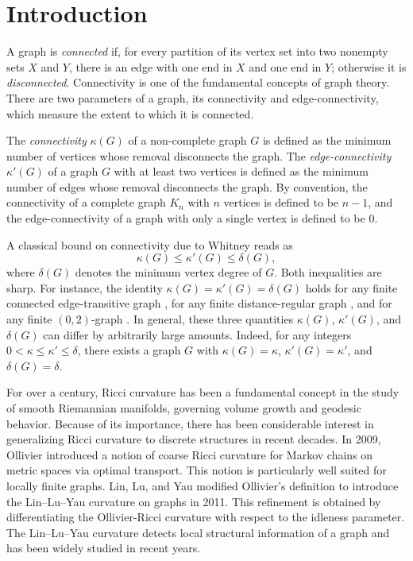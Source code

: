 \documentclass[10pt,a4paper]{article}
\theoremstyle{definition}
\theoremstyle{definition}
\theoremstyle{nonumber}
\begin{document}
\section{Introduction}

A graph is \textit{connected} if, for every partition of its vertex set into two nonempty sets $X$ and $Y$, there is an edge with one end in $X$ and one end in $Y$; otherwise it is \textit{disconnected}.
Connectivity is one of the fundamental concepts of graph theory.
There are two parameters of a graph, its connectivity and edge-connectivity, which measure the extent to which it is connected\cite{Bondy2008, Diestel2017}.

The \textit{connectivity} $\kappa(G)$ of a non-complete graph $G$ is defined as the minimum number of vertices whose removal disconnects the graph.
The \textit{edge-connectivity} $\kappa'(G)$ of a graph $G$ with at least two vertices is defined as the minimum number of edges whose removal disconnects the graph.
By convention, the connectivity of a complete graph $K_n$ with $n$ vertices is defined to be $n-1$, and the edge-connectivity of a graph with only a single vertex is defined to be $0$. 

A classical bound on connectivity due to Whitney \cite{Whitney1932} reads as
$$
\kappa(G) \leq \kappa'(G) \leq \delta(G),
$$
where $\delta(G)$ denotes the minimum vertex degree of $G$. 
Both inequalities are sharp. For instance, the identity $\kappa(G)=\kappa'(G)=\delta(G)$ holds for any finite connected edge-transitive graph \cite{Mader1971, Watkins1970}, for any finite distance-regular graph \cite{BrouwerHaemers2005, BrouwerKoolen2009, BrouwerMenser1985}, and for any finite $(0,2)$-graph \cite{BrouwerMulder1997}. 
In general, these three quantities $\kappa(G)$, $\kappa'(G)$, and $\delta(G)$ can differ by arbitrarily large amounts. Indeed, for any integers $0 < \kappa \leq \kappa' \leq \delta$, there exists a graph $G$ with $\kappa(G)=\kappa$, $\kappa'(G)=\kappa'$, and $\delta(G)=\delta$.

For over a century, Ricci curvature has been a fundamental concept in the study of smooth Riemannian manifolds, governing volume growth and geodesic behavior. 
Because of its importance, there has been considerable interest in generalizing Ricci curvature to discrete structures in recent decades. 
In 2009, Ollivier \cite{Ollivier} introduced a notion of coarse Ricci curvature for Markov chains on metric spaces via optimal transport. This notion is particularly well suited for locally finite graphs. Lin, Lu, and Yau \cite{LLY} modified Ollivier's definition to introduce the Lin--Lu--Yau curvature on graphs in 2011. This refinement is obtained by differentiating the Ollivier-Ricci curvature with respect to the idleness parameter. The Lin--Lu--Yau curvature detects local structural information of a graph and has been widely studied in recent years. 
\end{document}

